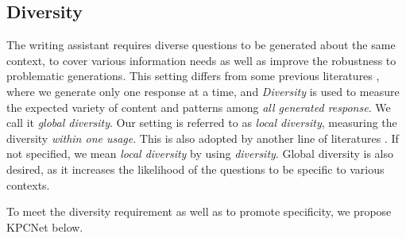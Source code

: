 \subsection{Diversity}

The writing assistant requires diverse questions to be generated about the same context, to cover various information needs as well as improve the robustness to problematic generations. This setting differs from some previous literatures \citep{wang2018learning, rao2019answer}, where we generate only one response at a time, and \textit{Diversity} is used to measure the expected variety of content and patterns among \textit{all generated response}. We call it \textit{global diversity}. Our setting is referred to as \textit{local diversity}, measuring the diversity \textit{within one usage}. This is also adopted by another line of literatures \citep{vijayakumar2018diverse, shen2019mixture}. If not specified, we mean \textit{local diversity} by using \textit{diversity}. Global diversity is also desired, as it increases the likelihood of the questions to be specific to various contexts. 


To meet the diversity requirement as well as to promote specificity, we propose KPCNet below.

